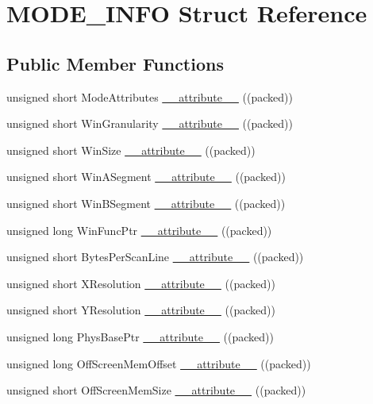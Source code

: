\hypertarget{structMODE__INFO}{}\section{M\+O\+D\+E\+\_\+\+I\+N\+FO Struct Reference}
\label{structMODE__INFO}
\subsection*{Public Member Functions}
\begin{DoxyCompactItemize}
\item 
unsigned short Mode\+Attributes \hyperlink{structMODE__INFO_a8bf8328690f068ccfb18884326888a1b}{\+\_\+\+\_\+attribute\+\_\+\+\_\+} ((packed))
\item 
unsigned short Win\+Granularity \hyperlink{structMODE__INFO_a44abe73ddf3dfd6292b0301d2902618b}{\+\_\+\+\_\+attribute\+\_\+\+\_\+} ((packed))
\item 
unsigned short Win\+Size \hyperlink{structMODE__INFO_ac14374727699ec4a0191d4a2211d37cd}{\+\_\+\+\_\+attribute\+\_\+\+\_\+} ((packed))
\item 
unsigned short Win\+A\+Segment \hyperlink{structMODE__INFO_a8d897c8e0f86ec20b6ef764c068951bc}{\+\_\+\+\_\+attribute\+\_\+\+\_\+} ((packed))
\item 
unsigned short Win\+B\+Segment \hyperlink{structMODE__INFO_ad4d1b216869d8c30587a70f256290d4d}{\+\_\+\+\_\+attribute\+\_\+\+\_\+} ((packed))
\item 
unsigned long Win\+Func\+Ptr \hyperlink{structMODE__INFO_a142be05530ff4e6eb76270e93620d0a8}{\+\_\+\+\_\+attribute\+\_\+\+\_\+} ((packed))
\item 
unsigned short Bytes\+Per\+Scan\+Line \hyperlink{structMODE__INFO_a0924c08d64daf68c62f14451ee64471d}{\+\_\+\+\_\+attribute\+\_\+\+\_\+} ((packed))
\item 
unsigned short X\+Resolution \hyperlink{structMODE__INFO_af9c2ac4bd5e22f8864befa54a80f2b4a}{\+\_\+\+\_\+attribute\+\_\+\+\_\+} ((packed))
\item 
unsigned short Y\+Resolution \hyperlink{structMODE__INFO_a60b087d89577683730bd6c4a1696efc5}{\+\_\+\+\_\+attribute\+\_\+\+\_\+} ((packed))
\item 
unsigned long Phys\+Base\+Ptr \hyperlink{structMODE__INFO_aa0b8371e8f354ced61fb5dcee07e61b9}{\+\_\+\+\_\+attribute\+\_\+\+\_\+} ((packed))
\item 
unsigned long Off\+Screen\+Mem\+Offset \hyperlink{structMODE__INFO_ac89a1c77b43a61b2635ef2df4aef826a}{\+\_\+\+\_\+attribute\+\_\+\+\_\+} ((packed))
\item 
unsigned short Off\+Screen\+Mem\+Size \hyperlink{structMODE__INFO_a3fbab6e2126465328be1a69e6bbbf253}{\+\_\+\+\_\+attribute\+\_\+\+\_\+} ((packed))
\end{DoxyCompactItemize}
